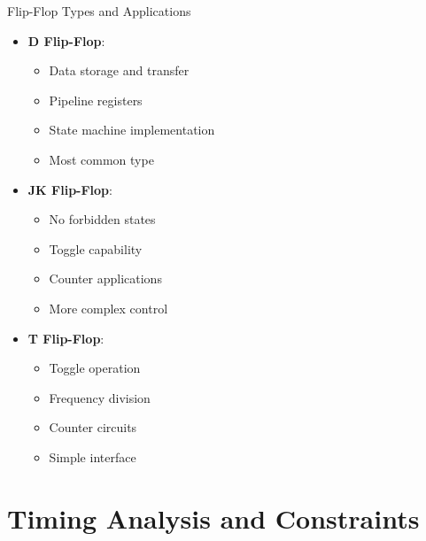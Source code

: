 \documentclass[aspectratio=169,11pt]{beamer}
\newcommand{\concept}[1]{\textbf{\color{accentcolor}#1}}
\begin{document}
\begin{frame}{Flip-Flop Types and Applications}
\begin{itemize}
\item \concept{D Flip-Flop}:
\begin{itemize}
\item Data storage and transfer
\item Pipeline registers
\item State machine implementation
\item Most common type
\end{itemize}
\vspace{0.3cm}
\item \concept{JK Flip-Flop}:
\begin{itemize}
\item No forbidden states
\item Toggle capability
\item Counter applications
\item More complex control
\end{itemize}
\vspace{0.3cm}
\item \concept{T Flip-Flop}:
\begin{itemize}
\item Toggle operation
\item Frequency division
\item Counter circuits
\item Simple interface
\end{itemize}
\end{itemize}
\end{frame}

\section{Timing Analysis and Constraints}
\end{document}
